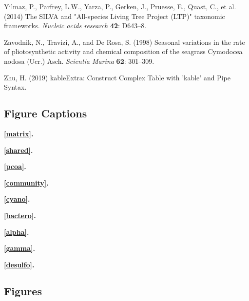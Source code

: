 \documentclass[12pt,]{article}
\begin{document}
\leavevmode\hypertarget{ref-Yilmaz2014}{}%
Yilmaz, P., Parfrey, L.W., Yarza, P., Gerken, J., Pruesse, E., Quast,
C., et al. (2014) The SILVA and "All-species Living Tree Project (LTP)"
taxonomic frameworks. \emph{Nucleic acids research} \textbf{42}:
D643--8.

\leavevmode\hypertarget{ref-Zavodnik1998}{}%
Zavodnik, N., Travizi, A., and De Rosa, S. (1998) Seasonal variations in
the rate of pliotosynthetic activity and chemical composition of the
seagrass Cymodocea nodosa (Ucr.) Asch. \emph{Scientia Marina}
\textbf{62}: 301--309.

\leavevmode\hypertarget{ref-Zhu2019}{}%
Zhu, H. (2019) kableExtra: Construct Complex Table with 'kable' and Pipe
Syntax.

\newpage 
\setlength\parindent{0pt}

\hypertarget{figure-captions}{%
\subsection{Figure Captions}\label{figure-captions}}

\textbf{\autoref{matrix}.} 

\textbf{\autoref{shared}.} 

\textbf{\autoref{pcoa}.} 

\textbf{\autoref{community}.} 

\textbf{\autoref{cyano}.} 

\textbf{\autoref{bactero}.} 

\textbf{\autoref{alpha}.} 

\textbf{\autoref{gamma}.} 

\textbf{\autoref{desulfo}.} 

\hypertarget{figures}{%
\subsection{Figures}\label{figures}}
\end{document}

